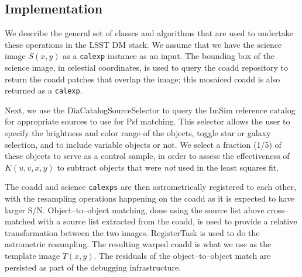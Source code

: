 \documentclass[prd, nofootinbib, floatfix, 11pt,tightenlines,times]{article}
\begin{document}

\subsection{Implementation}

We describe the general set of classes and algorithms that are used to
undertake these operations in the LSST DM stack.  We assume that we
have the science image $S(x,y)$ as a {\tt calexp} instance as an
input.  The bounding box of the science image, in celestial
coordinates, is used to query the coadd repository to return the coadd
patches that overlap the image; this mosaiced coadd is also returned
as a {\tt calexp}.

Next, we use the DiaCatalogSourceSelector to query the ImSim reference
catalog for appropriate sources to use for Psf matching.  This
selector allows the user to specify the brightness and color range of
the objects, toggle star or galaxy selection, and to include variable
objects or not.  We select a fraction (1/5) of these objects to serve
as a control sample, in order to assess the effectiveness of
$K(u,v,x,y)$ to subtract objects that were {\it not} used in the least
squares fit.

The coadd and science {\tt calexps} are then astrometrically
registered to each other, with the resampling operations happening on
the coadd as it is expected to have larger S/N.  Object--to--object
matching, done using the source list above cross--matched with a
source list extracted from the coadd, is used to provide a relative
transformation between the two images.  RegisterTask is used to do the
astrometric resampling.  The resulting warped coadd is what we use as
the template image $T(x,y)$.  The residuals of the object--to--object
match are persisted as part of the debugging infrastructure.
\end{document}
